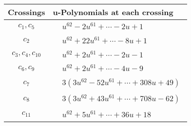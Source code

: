 \documentclass[1p]{elsarticle_modified}
\theoremstyle{definition}
\begin{document}
\begin{tabular}{m{50pt}|m{274pt}}
Crossings & \hspace{64pt}u-Polynomials at each crossing \\
\hline $$\begin{aligned}c_{1},c_{5}\end{aligned}$$&$\begin{aligned}
&u^{62}-2 u^{61}+\cdots-2 u+1
\end{aligned}$\\
\hline $$\begin{aligned}c_{2}\end{aligned}$$&$\begin{aligned}
&u^{62}+22 u^{61}+\cdots-8 u+1
\end{aligned}$\\
\hline $$\begin{aligned}c_{3},c_{4},c_{10}\end{aligned}$$&$\begin{aligned}
&u^{62}+2 u^{61}+\cdots-2 u-1
\end{aligned}$\\
\hline $$\begin{aligned}c_{6},c_{9}\end{aligned}$$&$\begin{aligned}
&u^{62}+2 u^{61}+\cdots-4 u-9
\end{aligned}$\\
\hline $$\begin{aligned}c_{7}\end{aligned}$$&$\begin{aligned}
&3(3 u^{62}-52 u^{61}+\cdots+308 u+49)
\end{aligned}$\\
\hline $$\begin{aligned}c_{8}\end{aligned}$$&$\begin{aligned}
&3(3 u^{62}+43 u^{61}+\cdots+708 u-62)
\end{aligned}$\\
\hline $$\begin{aligned}c_{11}\end{aligned}$$&$\begin{aligned}
&u^{62}+5 u^{61}+\cdots+36 u+18
\end{aligned}$\\
\hline
\end{tabular}\\~\\
\newpage\renewcommand{\arraystretch}{1}
\end{document}
